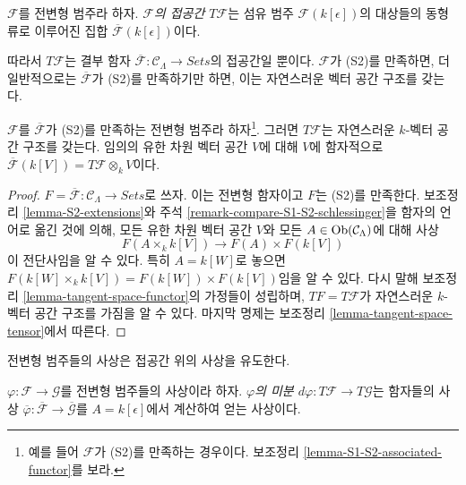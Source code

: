 \begin{definition}
\label{definition-tangent-space}
$\mathcal{F}$를 전변형 범주라 하자.
{\it $\mathcal{F}$의 접공간 $T \mathcal{F}$}는
섬유 범주 $\mathcal F(k[\epsilon])$의 대상들의 동형류로 이루어진
집합 $\overline{\mathcal{F}}(k[\epsilon])$이다.
\end{definition}

\noindent
따라서 $T \mathcal{F}$는 결부 함자
$\overline{\mathcal{F}}: \mathcal{C}_\Lambda \to \textit{Sets}$의
접공간일 뿐이다. $\mathcal{F}$가 (S2)를 만족하면, 더 일반적으로는
$\overline{\mathcal{F}}$가 (S2)를 만족하기만 하면,
이는 자연스러운 벡터 공간 구조를 갖는다.

\begin{lemma}
\label{lemma-tangent-space-vector-space}
$\mathcal{F}$를 $\overline{\mathcal{F}}$가 (S2)를 만족하는
전변형 범주라 하자\footnote{예를 들어 $\mathcal{F}$가 (S2)를
만족하는 경우이다. 보조정리
\ref{lemma-S1-S2-associated-functor}를 보라.}.
그러면 $T \mathcal{F}$는 자연스러운 $k$-벡터 공간 구조를 갖는다.
임의의 유한 차원 벡터 공간 $V$에 대해 $V$에 함자적으로
$\overline{\mathcal{F}}(k[V]) = T\mathcal{F} \otimes_k V$이다.
\end{lemma}

\begin{proof}
$F = \overline{\mathcal{F}} :
\mathcal{C}_\Lambda \to \textit{Sets}$로 쓰자.
이는 전변형 함자이고 $F$는 (S2)를 만족한다. 보조정리
\ref{lemma-S2-extensions}와
주석 \ref{remark-compare-S1-S2-schlessinger}을 함자의 언어로
옮긴 것에 의해, 모든 유한 차원 벡터 공간 $V$와 모든
$A \in \mathop{\mathrm{Ob}}\nolimits(\mathcal{C}_\Lambda)$에 대해 사상
$$
F(A \times_k k[V]) \longrightarrow F(A) \times F(k[V])
$$
이 전단사임을 알 수 있다. 특히 $A = k[W]$로 놓으면
$F(k[W] \times_k k[V]) = F(k[W]) \times F(k[V])$임을 알 수 있다.
다시 말해 보조정리 \ref{lemma-tangent-space-functor}의 가정들이
성립하며, $TF = T \mathcal{F}$가 자연스러운 $k$-벡터 공간 구조를
가짐을 알 수 있다. 마지막 명제는 보조정리
\ref{lemma-tangent-space-tensor}에서 따른다.
\end{proof}

\noindent
전변형 범주들의 사상은 접공간 위의 사상을 유도한다.

\begin{definition}
\label{definition-differential}
$\varphi : \mathcal{F} \to \mathcal{G}$를 전변형 범주들의 사상이라 하자.
{\it $\varphi$의 미분
$d \varphi : T \mathcal{F} \to T \mathcal{G}$}는 함자들의 사상
$\overline{\varphi}: \overline{\mathcal{F}} \to
\overline{\mathcal{G}}$를 $A = k[\epsilon]$에서 계산하여 얻는 사상이다.
\end{definition}

